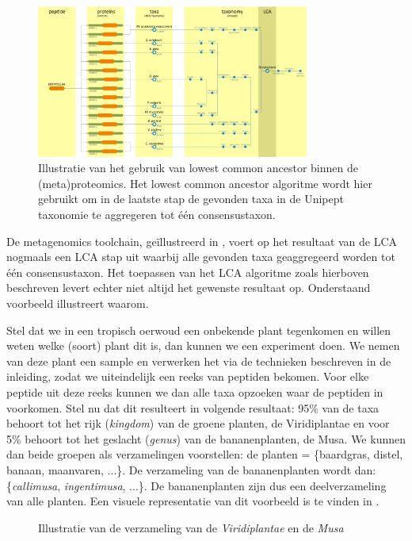 \begin{figure}
	\centering
    \includegraphics[width=0.8\textwidth]{includes/workflow}
    \caption{Illustratie van het gebruik van lowest common ancestor binnen de 
    (meta)proteomics. Het lowest common ancestor algoritme wordt hier gebruikt 
    om in de laatste stap de gevonden taxa in de Unipept taxonomie te 
    aggregeren tot één consensustaxon.}
    \label{fig:workflow}
\end{figure}

De metagenomics toolchain, geïllustreerd in , voert op het
resultaat van de LCA nogmaals een LCA stap uit waarbij alle gevonden taxa
geaggregeerd worden tot één consensustaxon. Het toepassen van het LCA algoritme
zoals hierboven beschreven levert echter niet altijd het gewenste resultaat op.
Onderstaand voorbeeld illustreert waarom.

Stel dat we in een tropisch oerwoud een onbekende plant tegenkomen en willen
weten welke (soort) plant dit is, dan kunnen we een experiment doen. We nemen
van deze plant een sample en verwerken het via de technieken beschreven in de
inleiding, zodat we uiteindelijk een reeks van peptiden bekomen. Voor elke
peptide uit deze reeks kunnen we dan alle taxa opzoeken waar de peptiden in
voorkomen. Stel nu dat dit resulteert in volgende resultaat: 95\% van de taxa
behoort tot het rijk (\textit{kingdom}) van de groene planten, de Viridiplantae
en voor 5\% behoort tot het geslacht (\textit{genus}) van de bananenplanten, de
Musa. We kunnen dan beide groepen als verzamelingen voorstellen: de planten =
\{baardgras, distel, banaan, maanvaren, ...\}. De verzameling van de
bananenplanten wordt dan: \{\textit{callimusa}, \textit{ingentimusa}, ...\}. De
bananenplanten zijn dus een deelverzameling van alle planten. Een visuele
representatie van dit voorbeeld is te vinden in .

\begin{figure}
	\centering
    \caption{Illustratie van de verzameling van de \textit{Viridiplantae} en de 
    \textit{Musa}}
    \label{tikz:verzameling}
\end{figure}


